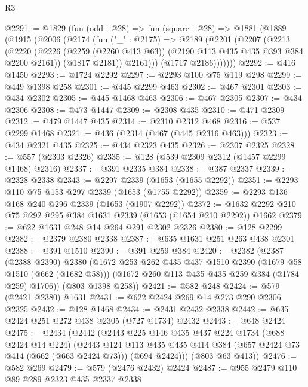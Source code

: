 \begin{lexlean}{R3}
\begin{coremodule}
@2291 := @1829
    (fun (odd : @28) =>
    fun (square : @28) =>
    @1881
      (@1889
        (@1915
          (@2006
            (@2174
              (fun ("_" : @2175) =>
              @2189
                (@2201
                  (@2207
                    (@2213
                      (@2220
                        (@2226
                          (@2259 (@2260 @413 @63))
                          (@2190 @113 @435 @435 @393 @384 @2200 @2161))
                        (@1817 @2181))
                      @2161)))
                (@1717 @2186)))))))
@2292 := @416 @1450
@2293 := @1724 @2292
@2297 := @2293 @100 @75 @119 @298
@2299 := @449 @1398 @258
@2301 := @445 @2299 @463
@2302 := @467 @2301
@2303 := @434 @2302
@2305 := @445 @1468 @463
@2306 := @467 @2305
@2307 := @434 @2306
@2308 := @473 @1447
@2309 := @2308 @435
@2310 := @471 @2309
@2312 := @479 @1447 @435
@2314 := @2310 @2312 @468
@2316 := @537 @2299 @1468
@2321 := @436 (@2314 (@467 (@445 @2316 @463)))
@2323 := @434 @2321 @435
@2325 := @434 @2323 @435
@2326 := @2307 @2325
@2328 := @557 (@2303 @2326)
@2335 := @128 (@539 @2309 @2312 (@1457 @2299 @1468) @2316)
@2337 := @391 @2335 @384
@2338 := @387 @2337
@2339 := @2328 @2338
@2343 := @2297 @2339 (@1653 (@1655 @2292))
@2351 := @2293 @110 @75 @153 @297 @2339 (@1653 (@1755 @2292))
@2359 := @2293 @136 @168 @240 @296 @2339 (@1653 (@1907 @2292))
@2372 := @1632 @2292 @210 @75 @292 @295 @384 @1631 @2339 (@1653 (@1654 @210 @2292)) @1662
@2379 := @622 @1631 @248 @14 @264 @291 @2302 @2326
@2380 := @128 @2299
@2382 := @2379 @2380 @2338
@2387 := @635 @1631 @251 @263 @438 @2301
@2388 := @391 @1510
@2390 := @391 @259 @384
@2420 := @2382
    (@2387
      (@2388 @2390)
      @2380
      (@1672
        @253
        @262
        @435
        @437
        @1510
        @2390
        (@1679 @58 @1510 (@662 (@1682 @58)))
        (@1672 @260 @113 @435 @435 @259 @384 (@1784 @259) @1706))
      (@803 @1398 @258))
@2421 := @582 @248
@2424 := @579 (@2421 @2380) @1631
@2431 := @622 @2424 @269 @14 @273 @290 @2306 @2325
@2432 := @128 @1468
@2434 := @2431 @2432 @2338
@2442 := @635 @2424 @251 @272 @438 @2305 (@727 @1734) @2432
@2443 := @648 @2424
@2475 := @2434
    (@2442
      (@2443
        @225
        @146
        @435
        @437
        @224
        @1734
        (@688 @2424 @14 @224)
        (@2443
          @124
          @113
          @435
          @435
          @414
          @384
          (@657 @2424 @73 @414 (@662 (@663 @2424 @73)))
          (@694 @2424)))
      (@803 @63 @413))
@2476 := @582 @269
@2479 := @579 (@2476 @2432) @2424
@2487 := @955 @2479 @110 @89 @289 @2323 @435 @2337 @2338

\end{coremodule}
\end{lexlean}
